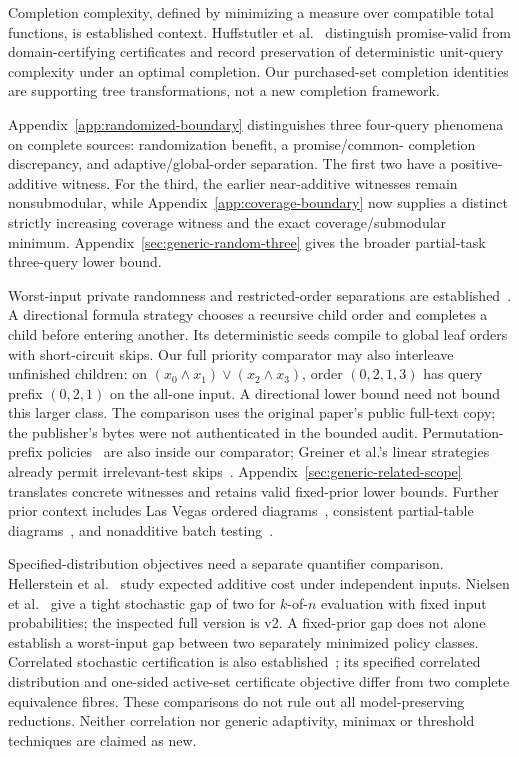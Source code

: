 \documentclass[pdflatex,sn-mathphys-num]{sn-jnl}
\theoremstyle{thmstyleone}
\theoremstyle{thmstylethree}
\theoremstyle{thmstyletwo}
\begin{document}
Completion complexity, defined by minimizing a measure over compatible total functions, is established context. Huffstutler et al.~\cite{huffstutler2026completion} distinguish promise-valid from domain-certifying certificates and record preservation of deterministic unit-query complexity under an optimal completion. Our purchased-set completion identities are supporting tree transformations, not a new completion framework.

Appendix~\ref{app:randomized-boundary} distinguishes three four-query
phenomena on complete sources: randomization benefit, a promise/common-
completion discrepancy, and adaptive/global-order separation. The first
two have a positive-additive witness. For the third, the earlier
near-additive witnesses remain nonsubmodular, while
Appendix~\ref{app:coverage-boundary} now supplies a distinct strictly
increasing coverage witness and the exact coverage/submodular minimum.
Appendix~\ref{sec:generic-random-three} gives the broader partial-task
three-query lower bound.

Worst-input private randomness and restricted-order separations are established~\cite{amano2011directional}. A directional formula strategy chooses a recursive child order and completes a child before entering another. Its deterministic seeds compile to global leaf orders with short-circuit skips. Our full priority comparator may also interleave unfinished children: on $(x_0\wedge x_1)\vee(x_2\wedge x_3)$, order $(0,2,1,3)$ has query prefix $(0,2,1)$ on the all-one input. A directional lower bound need not bound this larger class. The comparison uses the original paper's public full-text copy; the publisher's bytes were not authenticated in the bounded audit. Permutation-prefix policies~\cite{hellerstein2022adaptivity} are also inside our comparator; Greiner et al.'s linear strategies already permit irrelevant-test skips~\cite{greiner}. Appendix~\ref{sec:generic-related-scope} translates concrete witnesses and retains valid fixed-prior lower bounds. Further prior context includes Las Vegas ordered diagrams~\cite{karpinski1999}, consistent partial-table diagrams~\cite{kristensen2006}, and nonadditive batch testing~\cite{harris2025}.

Specified-distribution objectives need a separate quantifier comparison.
Hellerstein et al.~\cite{hellerstein2022adaptivity} study expected additive
cost under independent inputs. Nielsen et al.~\cite{nielsen2025kofn}
give a tight stochastic gap of two for $k$-of-$n$ evaluation with fixed
input probabilities; the inspected full version is v2. A fixed-prior
gap does not alone establish a worst-input gap between two separately
minimized policy classes. Correlated stochastic certification is also
established~\cite{ghuge2026correlations}; its specified correlated
distribution and one-sided active-set certificate objective differ from
two complete equivalence fibres. These comparisons do not rule out all
model-preserving reductions. Neither correlation nor generic adaptivity,
minimax or threshold techniques are claimed as new.
\end{document}
